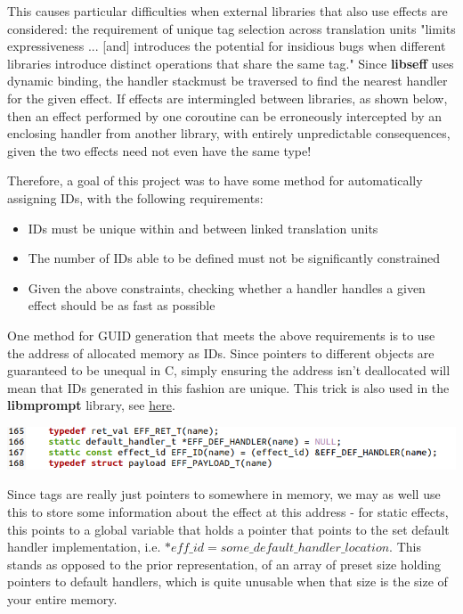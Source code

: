 \documentclass[logo,bsc,singlespacing,parskip,online]{infthesis}
\begin{document}
This causes particular difficulties when external libraries that also use effects are considered: the requirement of unique tag selection across translation units "limits expressiveness ... [and] introduces the potential for insidious bugs when different libraries introduce distinct operations that share the same tag."\cite{libseff_paper} Since \textbf{libseff} uses dynamic binding\cite{libseff_paper}, the handler stack\todo* must be traversed to find the nearest handler for the given effect. If effects are intermingled between libraries, as shown below, then an effect performed by one coroutine can be erroneously intercepted by an enclosing handler from another library, with entirely unpredictable consequences, given the two effects need not even have the same type!

Therefore, a goal of this project was to have some method for automatically assigning IDs, with the following requirements:

\begin{itemize}
\item IDs must be unique within and between linked translation units
\item The number of IDs able to be defined must not be significantly constrained
\item Given the above constraints, checking whether a handler handles a given effect should be as fast as possible
\end{itemize}

One method for GUID generation that meets the above requirements is to use the address of allocated memory as IDs. Since pointers to different objects are guaranteed to be unequal in C\textcite[see § 6.5.10 para 7]{iso9899-2024}, simply ensuring the address isn't deallocated will mean that IDs generated in this fashion are unique. This trick is also used in the \textbf{libmprompt} library, see \href{https://github.com/koka-lang/libmprompt/blob/main/include/mpeff.h#L155}{here}.\cite{libmprompt}

\includegraphics[scale=0.7]{ID_def_code.png}

Since tags are really just pointers to somewhere in memory, we may as well use this to store some information about the effect at this address - for static effects, this points to a global variable that holds a pointer that points to the set default handler implementation, i.e.  $*eff\_id = some\_default\_handler\_location$. This stands as opposed to the prior representation, of an array of preset size holding pointers to default handlers, which is quite unusable when that size is the size of your entire memory.
\end{document}
